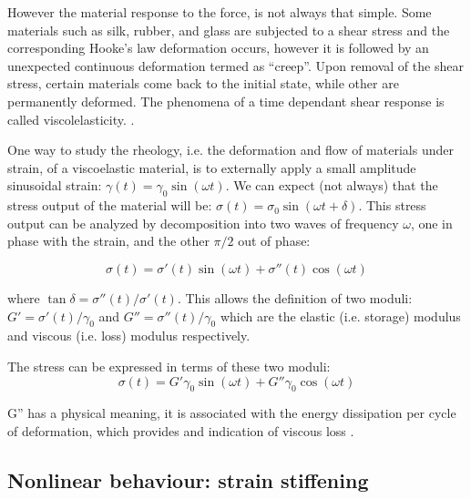However the material response to the force, is not always that simple. Some
materials such as silk, rubber, and glass are subjected to a shear
stress and the corresponding Hooke's law deformation occurs, however it is
followed by an unexpected continuous deformation termed as ``creep''. Upon
removal of the shear stress, certain materials come back to the initial state,
while other are permanently deformed. The phenomena of a time dependant shear
response is called viscolelasticity. \citep{macosko_rheology:_1994}.

One way to study the rheology, i.e. the deformation and flow of materials under
strain, of a viscoelastic material, is to externally apply a small amplitude
sinusoidal strain:
$\gamma(t)=\gamma_0\sin(\omega t)$. We can expect (not always) that the stress output of the material will be:
$\sigma(t) = \sigma_0 \sin(\omega t + \delta)$. This stress output can be
analyzed by decomposition into two waves of frequency $\omega$, one in phase
with the strain, and the other $\pi/2$ out of phase:

\begin{equation}\label{viscoelastic-stress}
\sigma(t) = \sigma'(t) \sin(\omega t) + \sigma''(t)\cos(\omega t)
\end{equation}

where $ \tan \delta=\sigma''(t)/\sigma'(t)$. This allows the definition of two
moduli: $G'=\sigma'(t)/\gamma_0$ and $G''=\sigma''(t)/\gamma_0$ which are the
elastic (i.e. storage) modulus and viscous (i.e. loss) modulus respectively.

The stress can be expressed in terms of these two moduli:
\begin{equation}\label{viscoelastic-stress-G}
\sigma(t) = G'\gamma_0 \sin(\omega t) + G''\gamma_0\cos(\omega t)
\end{equation}

G'' has a physical meaning, it is associated with the energy dissipation per
cycle of deformation, which provides and indication of viscous loss
\citep{macosko_rheology:_1994}.
\subsection{Nonlinear behaviour: strain stiffening}

